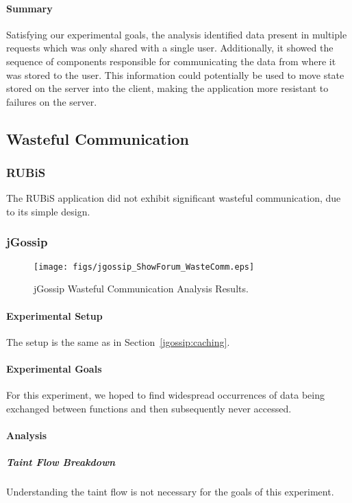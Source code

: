 \documentclass[msc,oneside]{ubcthesis}
\begin{document}
\paragraph{Summary}
Satisfying our experimental goals, the analysis identified data present in multiple requests which was only shared with a single user. Additionally, it showed the sequence of components responsible for communicating the data from where it was stored to the user. This information could potentially be used to move state stored on the server into the client, making the application more resistant to failures on the server.

\subsection{Wasteful Communication}
\label{ana:waste}
\subsubsection{RUBiS}

The RUBiS application did not exhibit significant wasteful communication, due to its simple design.

\subsubsection{jGossip} 

\begin{sidewaysfigure}
\centering
\scalebox{0.2}
{\texttt{[image: figs/jgossip\_ShowForum\_WasteComm.eps]}}
\caption{jGossip Wasteful Communication Analysis Results.} 
\label{fig:showforumcomm}
\end{sidewaysfigure}

\paragraph{Experimental Setup}
The setup is the same as in Section~\ref{jgossip:caching}.

\paragraph{Experimental Goals}
For this experiment, we hoped to find widespread occurrences of data being exchanged between functions and then subsequently never accessed.

\paragraph{Analysis}
\subparagraph{Taint Flow Breakdown}
Understanding the taint flow is not necessary for the goals of this experiment.
\end{document}

